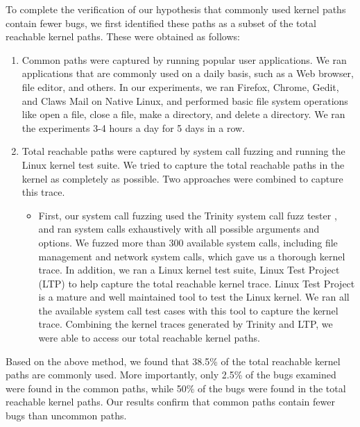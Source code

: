 To complete the verification of our hypothesis that commonly used kernel
paths contain fewer bugs, 
we first identified these paths as a subset of the total reachable kernel
paths. These were obtained as follows:

\begin{enumerate}
\item Common paths were captured by running popular user applications. 
We ran applications that are commonly used on a daily basis, such as a Web
browser, file editor, and others. 
In our experiments, we ran Firefox, Chrome, Gedit, and Claws Mail on Native
Linux, 
  
and performed basic file system operations like open a file, close a file,
make a directory, 
and delete a directory. We ran the experiments 3-4 hours a day for  5 days
in a row.  

\item Total reachable paths were captured by system call fuzzing and
running the Linux kernel test suite. 
We tried to capture the total reachable paths in the kernel as completely
as possible. 
Two approaches were combined to capture this trace.

\begin{itemize}
\item First, our system call fuzzing used the Trinity system call fuzz
tester \cite{Trinity}, 
and ran system calls exhaustively with all possible arguments and options. 
We fuzzed more than 300 available system calls, including file management
and network system calls, 
which gave us a thorough kernel trace. In addition, we ran a Linux kernel
test suite, 
Linux Test Project (LTP) \cite{LTP} to help capture the total reachable
kernel trace. 
Linux Test Project is a mature and well maintained tool to test the Linux
kernel. 
We ran all the available system call test cases with this tool to capture
the kernel trace. 
Combining the kernel traces generated by Trinity and LTP, we were able to
access our total reachable kernel paths.
\end{itemize}
\end{enumerate}

Based on the above method, we found that 38.5\% of the total reachable
kernel paths are commonly used. 
More importantly, only 2.5\% of the bugs examined were found in the common
paths, 
while 50\% of the bugs were found in the total reachable kernel paths. 
Our results confirm that common paths contain fewer bugs than uncommon
paths. 

